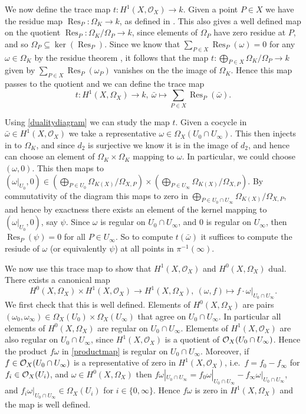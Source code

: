 \documentclass[draft, 11pt]{article} %
\theoremstyle{plain}
\theoremstyle{remark}
\newcommand{\cO}{{\cal O}}
\newcommand{\ra}{\rightarrow}
\newcommand{\hzero}{{H^0(X,\Omega_X)}}
\newcommand{\hone}{H^1(X,\mathcal{O}_X)}
\DeclareMathOperator{\res}{Res}
\begin{document}
We now define the trace map $t\colon \hone \ra k$.
Given a point $P\in X$ we have the residue map $\res_P \colon \Omega_K \ra k$, as defined in \cite[Chap III, Thm. 7.14.1]{hart}.
This also gives a well defined map on the quotient $\res_P \colon \Omega_K/\Omega_P \ra k$, since elements of $\Omega_P$ have zero residue at $P$, and so $\Omega_P \subseteq \ker \left(\res_P\right)$.
Since we know that $\sum_{P\in X}\res_P(\omega) = 0$ for any $\omega \in \Omega_K$ by the residue theorem \cite[Chap. III, Thm. 7.14.2]{hart},  it follows that the map $t \colon \bigoplus_{P \in X} \Omega_K/\Omega_P \ra k$ given by $\sum_{P\in X} \res_P(\omega_P)$ vanishes on the the image of $\Omega_K$.
Hence this map passes to the quotient and we can define the trace map
\[
t \colon H^1\left(X, \Omega_X\right) \ra k,\ \bar \omega \mapsto \sum_{P \in X} \res_P(\bar \omega).
\]

Using \eqref{dualitydiagram} we can study the map $t$.
Given a cocycle in $\bar \omega \in \hone$ we take a representative $\omega \in \Omega_X(U_0 \cap U_\infty)$.
This then injects in to $\Omega_K$, and since $d_2$ is surjective we know it is in the image of $d_2$, and hence can choose an element of $\Omega_K \times \Omega_K$ mapping to $\omega$.
In particular, we could choose $(\omega,0)$.
This then maps to $(\omega|_{U_0}, 0) \in \left( \bigoplus_{P \in U_0} \Omega_{K(X)}/\Omega_{X,P}\right) \times \left( \bigoplus_{P \in U_\infty} \Omega_{K(X)}/\Omega_{X,P} \right)$.
By commutativity of the diagram this maps to zero in $\bigoplus_{P \in U_0 \cap U_\infty} \Omega_{K(X)}/\Omega_{X,P}$, and hence by exactness there exists an element of the kernel mapping to $(\omega|_{U_0},0)$, say $\psi$.
Since $\omega$ is regular on $U_0 \cap U_\infty$, and $0$ is regular on $U_\infty$, then $\res_P(\psi) = 0$ for all $P \in U_\infty$.
So to compute $t(\bar \omega)$ it suffices to compute the resiude of $\omega$ (or equivalently $\psi$) at all points in $\pi^{-1}(\infty)$.

We now use this trace map to show that $\hone$ and $\hzero$ dual.
There exists a canonical map 
\begin{equation}\label{productmap}
\hzero \times \hone \ra H^1\left(X, \Omega_X\right), \ (\omega, f) \mapsto f \cdot \omega|_{U_0 \cap U_\infty}.
\end{equation}
We first check that this is well defined.
Elements of $\hzero$ are pairs $(\omega_0, \omega_\infty) \in \Omega_X(U_0) \times \Omega_X(U_\infty)$ that agree on $U_0 \cap U_\infty$.
In particular all elements of $\hzero$ are regular on $U_0 \cap U_\infty$.
Elements of $\hone$ are also regular on $U_0 \cap U_\infty$, since $\hone$ is a quotient of $\cO_X(U_0 \cap U_\infty)$.
Hence the product $f \omega$ in \eqref{productmap} is regular on $U_0 \cap U_\infty$.
Moreover, if $f \in \cO_X(U_0 \cap U_\infty)$ is a representative of zero in $\hone$, i.e.~$f = f_0 - f_\infty$ for $f_i \in \cO_X(U_i)$, and $\omega  \in \hzero$ then $f \omega|_{U_0 \cap U_\infty} = f_0\omega|_{U_0 \cap U_\infty} - f_\infty \omega|_{U_0 \cap U_\infty}$, and $f_i \omega|_{U_0\cap U_\infty} \in \Omega_X(U_i)$ for $i\in \{0, \infty\}$.
Hence $f\omega$ is zero in $H^1(X,\Omega_X)$ and the map is well defined.
\end{document}
